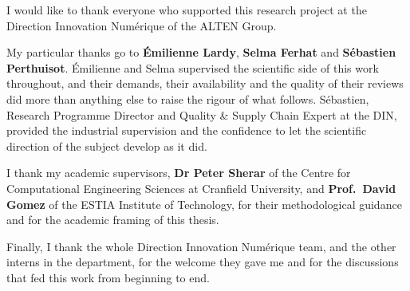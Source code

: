 I would like to thank everyone who supported this research project at the Direction
Innovation Num\'erique of the ALTEN Group.

My particular thanks go to \textbf{\'Emilienne Lardy}, \textbf{Selma Ferhat} and
\textbf{S\'ebastien Perthuisot}. \'Emilienne and Selma supervised the scientific side of
this work throughout, and their demands, their availability and the quality of their
reviews did more than anything else to raise the rigour of what follows. S\'ebastien,
Research Programme Director and Quality \& Supply Chain Expert at the DIN, provided the
industrial supervision and the confidence to let the scientific direction of the subject
develop as it did.

I thank my academic supervisors, \textbf{Dr Peter Sherar} of the Centre for Computational
Engineering Sciences at Cranfield University, and \textbf{Prof.\ David Gomez} of the ESTIA
Institute of Technology, for their methodological guidance and for the academic framing of
this thesis.

Finally, I thank the whole Direction Innovation Num\'erique team, and the other interns in
the department, for the welcome they gave me and for the discussions that fed this work
from beginning to end.

